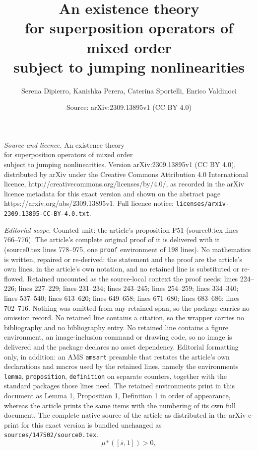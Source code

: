 \documentclass[10pt,a4paper]{amsart}
\title{An existence theory \\ for superposition operators of mixed order\\ subject to jumping nonlinearities}
\author{Serena Dipierro, Kanishka Perera, Caterina Sportelli, Enrico Valdinoci}
\date{Source: arXiv:2309.13895v1 (CC BY 4.0)}
\begin{document}
\maketitle

\noindent\emph{Source and licence.} An existence theory \\ for superposition operators of mixed order\\ subject to jumping nonlinearities. Version arXiv:2309.13895v1 (CC BY 4.0), distributed by arXiv under the Creative Commons Attribution 4.0 International licence, http://creativecommons.org/licenses/by/4.0/, as recorded in the arXiv licence metadata for this exact version and shown on the abstract page https://arxiv.org/abs/2309.13895v1. Full licence notice: \texttt{licenses/arxiv-2309.13895-CC-BY-4.0.txt}.\par\smallskip

\noindent\textit{Editorial scope.} Counted unit: the article's proposition P51 (source0.tex lines 766--776). The article's complete original proof of it is delivered with it (source0.tex lines 778--975, one \texttt{proof} environment of 198 lines). No mathematics is written, repaired or re-derived: the statement and the proof are the article's own lines, in the article's own notation, and no retained line is substituted or re-flowed.  Retained uncounted as the source-local context the proof needs: lines 224--226; lines 227--229; lines 231--234; lines 243--245; lines 254--259; lines 334--340; lines 537--540; lines 613--620; lines 649--658; lines 671--680; lines 683--686; lines 702--716.  Nothing was omitted from any retained span, so the package carries no omission record.  No retained line contains a citation, so the wrapper carries no bibliography and no bibliography entry.  No retained line contains a figure environment, an image-inclusion command or drawing code, so no image is delivered and the package declares no asset dependency.  Editorial formatting only, in addition: an AMS \texttt{amsart} preamble that restates the article's own declarations and macros used by the retained lines, namely the environments \texttt{lemma}, \texttt{proposition}, \texttt{definition} on separate counters, together with the standard packages those lines need.  The retained environments print in this document as Lemma 1, Proposition 1, Definition 1 in order of appearance, whereas the article prints the same items with the numbering of its own full document.  The complete native source of the article as distributed in the arXiv e-print for this exact version is bundled unchanged as \texttt{sources/147502/source0.tex}.
\begin{equation}\label{mu00}
{\mu^+}([\overline s, 1])>0,
\end{equation}
\end{document}
